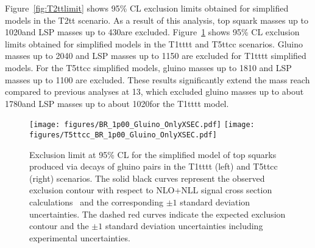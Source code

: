 Figure~\ref{fig:T2ttlimit} shows 95\% CL exclusion limits obtained for simplified models in the T2tt scenario.
As a result of this analysis, top squark masses up to 1020\GeV and LSP masses up to 430\GeV are excluded. 
Figure~\ref{fig:T1ttttlimit} shows 95\% CL exclusion limits obtained for simplified models in the T1tttt and T5ttcc scenarios.
Gluino masses up to 2040 \GeV and LSP masses up to 1150 \GeV are excluded for T1tttt simplified models.
For the T5ttcc simplified models, gluino masses up to 1810 \GeV and LSP masses up to 1100 \GeV are excluded.
These results significantly extend the mass reach compared to previous analyses at 13\TeV, which excluded gluino masses up to about 1780\GeV and LSP masses up to about 1020\GeV for the T1tttt model.  

\begin{figure}[!h]
\centering
\texttt{[image: figures/BR\_1p00\_Gluino\_OnlyXSEC.pdf]}
\texttt{[image: figures/T5ttcc\_BR\_1p00\_Gluino\_OnlyXSEC.pdf]}
\caption{ Exclusion limit at 95\% CL for the simplified model of top squarks produced via decays of gluino pairs in the T1tttt (left) and T5ttcc (right) scenarios. 
The solid black curves represent the observed exclusion contour with respect to NLO+NLL signal cross section calculations~\cite{Borschensky:2014cia} and the corresponding $\pm 1$ standard deviation uncertainties. 
The dashed red curves indicate the expected exclusion contour and the $\pm 1$ standard deviation uncertainties including experimental uncertainties. }
\label{fig:T1ttttlimit}
\end{figure}


